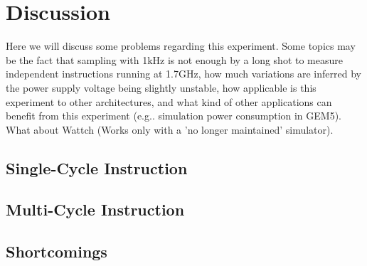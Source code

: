 \section{Discussion}
Here we will discuss some problems regarding this experiment. Some topics may be
the fact that sampling with 1kHz is not enough by a long shot to measure
independent instructions running at 1.7GHz, how much variations are inferred by
the power supply voltage being slightly unstable, how applicable is this
experiment to other architectures, and what kind of other applications can
benefit from this experiment (e.g.. simulation power consumption in GEM5). What
about Wattch (Works only with a 'no longer maintained' simulator).


\subsection{Single-Cycle Instruction}

\subsection{Multi-Cycle Instruction}

\subsection{Shortcomings}

